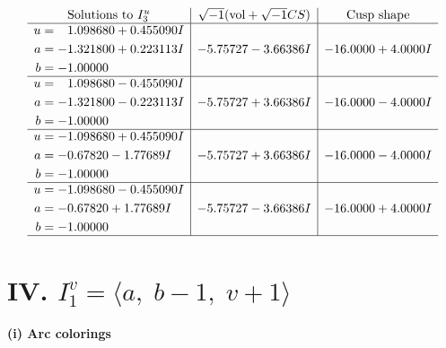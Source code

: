 \documentclass[1p]{elsarticle_modified}
\theoremstyle{definition}
\newcommand{\I}{\sqrt{-1}}
\begin{document}
$$\begin{array}{c|c|c}  
\text{Solutions to }I^u_{3}& \I (\text{vol} + \sqrt{-1}CS) & \text{Cusp shape}\\
 \hline 
\begin{aligned}
u &= \phantom{-}1.098680 + 0.455090 I \\
a &= -1.321800 + 0.223113 I \\
b &= -1.00000\phantom{ +0.000000I}\end{aligned}
 & -5.75727 - 3.66386 I & -16.0000 + 4.0000 I \\ \hline\begin{aligned}
u &= \phantom{-}1.098680 - 0.455090 I \\
a &= -1.321800 - 0.223113 I \\
b &= -1.00000\phantom{ +0.000000I}\end{aligned}
 & -5.75727 + 3.66386 I & -16.0000 - 4.0000 I \\ \hline\begin{aligned}
u &= -1.098680 + 0.455090 I \\
a &= -0.67820 - 1.77689 I \\
b &= -1.00000\phantom{ +0.000000I}\end{aligned}
 & -5.75727 + 3.66386 I & -16.0000 - 4.0000 I \\ \hline\begin{aligned}
u &= -1.098680 - 0.455090 I \\
a &= -0.67820 + 1.77689 I \\
b &= -1.00000\phantom{ +0.000000I}\end{aligned}
 & -5.75727 - 3.66386 I & -16.0000 + 4.0000 I\\
 \hline 
 \end{array}$$\newpage\newpage\renewcommand{\arraystretch}{1}
\centering \section*{IV. $I^v_{1}= \langle a,\;b-1,\;v+1 \rangle$}
\flushleft \textbf{(i) Arc colorings}\\
\end{document}

